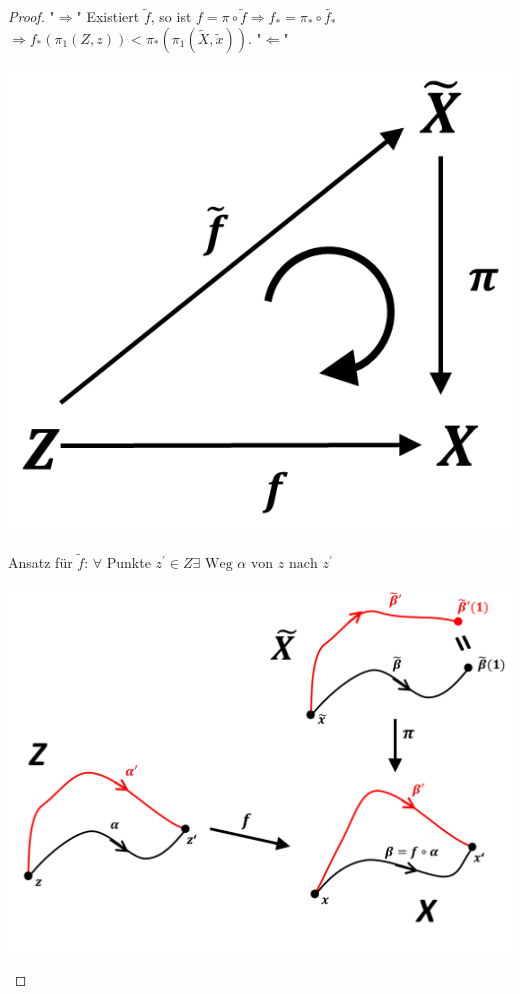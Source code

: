 \documentclass[a4paper,11pt,notitlepage]{report}
\theoremstyle{definition}
\begin{document}
\begin{proof}
	"$\Rightarrow$" Existiert $\widetilde{f}$, so ist $f = \pi \circ \widetilde{f} \Rightarrow f_* = \pi_* \circ \widetilde{f_*}$
	\newline
	$\Rightarrow f_*(\pi_1(Z,z)) < \pi_*(\pi_1(\widetilde{X},\widetilde{x}))$.
	\newline
	"$\Leftarrow$" \begin{center}
	 	\includegraphics[scale=0.5]{images/2011_12_22_Bild1.png}
	 \end{center} Ansatz für $\widetilde{f}$:
	\newline
	$\forall$ Punkte $z^\prime \in Z \exists \text{ Weg } \alpha \text{ von } z \text{ nach } z^\prime$ \begin{center}
	 	\includegraphics[scale=0.5]{images/2011_12_22_Bild2.png}

\end{center}
\end{proof}
\end{document}
